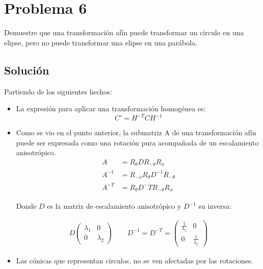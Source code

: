 \section*{Problema 6}
\setcounter{equation}{0}
Demuestre que una transformación afín puede transformar un círculo en una elipse,
pero no puede transformar una elipse en una parábola.

\subsection*{Solución}

Partiendo de los siguientes hechos:
\begin{itemize}
\item La expresión para aplicar una transformación homogénea es:
\begin{equation}
C' = H^{-T} C H^{-1}
\label{eq:p61}
\end{equation} 

\item Como se vio en el punto anterior, la submatriz A de una transformación afín
puede ser expresada como una rotación pura acompañada de un escalamiento anisotrópico.
\begin{equation}
\begin{aligned}
A &= R_\theta D R_{-\theta} R_\phi \\
A^{-1} &= R_{-\phi} R_{\theta} D^{-1} R_{-\theta} \\
A^{-T} &= R_\theta D^-{T} R_{-\theta} R_\phi 
\label{eq:p82}
\end{aligned}
\end{equation} 

Donde $D$ es la matriz de escalamiento anisotrópico y $D^{-1}$ su inversa:

\begin{equation*}
\begin{aligned}
D
\begin{pmatrix}
\lambda_1 & 0 \\ 
0 & \lambda_2
\end{pmatrix} 
\qquad
D^{-1}=D^{-T} = 
\begin{pmatrix}
\frac{1}{\lambda_1} & 0 \\ 
0 & \frac{1}{\lambda_2}
\end{pmatrix} 
\end{aligned}
\end{equation*} 

\item Las cónicas que representan círculos, no se ven afectadas por las rotaciones.


\end{itemize}
